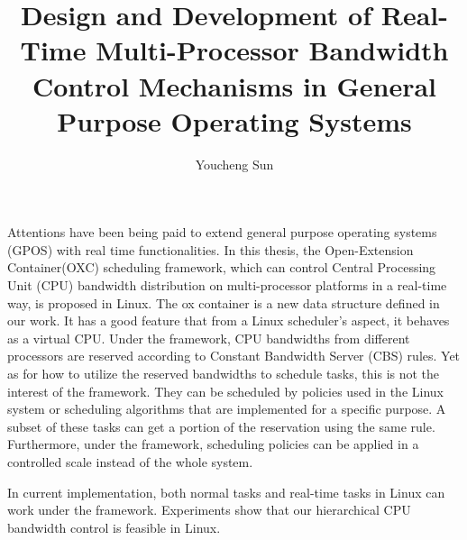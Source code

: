 \documentclass[a4paper, 12pt, openright, oneside, final]{book}%
\title{Design and Development of Real-Time Multi-Processor Bandwidth
  Control Mechanisms in General Purpose Operating Systems}
\author{Youcheng Sun}
\newcommand{\fncyblank}{\fancyhf{}}
\newenvironment{abstract}%
{\cleardoublepage\fncyblank\null\vfill\begin{center}%
\bfseries\abstractname\end{center}}%
{\vfill\null}
\begin{document}
\frontmatter




\begin{abstract}


  Attentions have been being paid to extend general purpose operating
  systems (GPOS) with real time functionalities. In this thesis, the
  Open-Extension Container(OXC) scheduling framework, which can control 
  Central Processing Unit (CPU) bandwidth distribution on multi-processor 
  platforms in a real-time way, is proposed in Linux. The ox container 
  is a new data structure defined in our work. It has a good feature 
  that from a Linux scheduler's aspect, it behaves as a virtual CPU.  
  Under the framework, CPU bandwidths from different processors are 
  reserved according to Constant Bandwidth Server (CBS) rules.  Yet 
  as for how to utilize the reserved bandwidths to schedule tasks, 
  this is not the interest of the framework. They can be scheduled by 
  policies used in the Linux system or scheduling algorithms that are 
  implemented for a specific purpose. A subset of these tasks can get 
  a portion of the reservation using the same rule.  Furthermore, under 
  the framework, scheduling policies can be applied in a controlled scale 
  instead of the whole system.

  In current implementation, both normal tasks and real-time tasks in
  Linux can work under the framework. Experiments show that our 
  hierarchical CPU bandwidth control is feasible in Linux.
\end{abstract}

\tableofcontents
\listoffigures
\lstlistoflistings

\mainmatter





\backmatter



\end{document}
